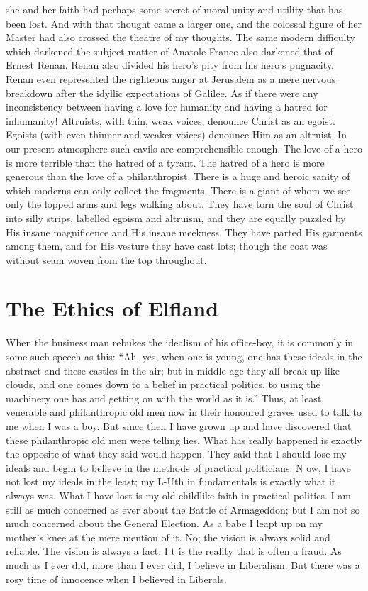 \documentclass{book}
\begin{document}
she and her faith had perhaps some secret of moral unity and utility that has been lost. And with that thought came a larger one, and the colossal figure of her Master had also crossed the theatre of my thoughts. The same modern difficulty which darkened the subject matter of Anatole France also darkened that of Ernest Renan. Renan also divided his hero’s pity from his hero’s pugnacity. Renan even represented the righteous anger at Jerusalem as a mere nervous breakdown after the idyllic expectations of Galilee. As if there were any inconsistency between having a love for humanity and having a hatred for inhumanity! Altruists, with thin, weak voices, denounce Christ as an egoist. Egoists (with even thinner and weaker voices) denounce Him as an altruist. In our present atmosphere such cavils are comprehensible enough. The love of a hero is more terrible than the hatred of a tyrant. The hatred of a hero is more generous than the love of a philanthropist. There is a huge and heroic sanity of which moderns can only collect the fragments. There is a giant of whom we see only the lopped arms and legs walking about. They have torn the soul of Christ into silly strips, labelled egoism and altruism, and they are equally puzzled by His insane magnificence and His insane meekness. They have parted His garments among them, and for His vesture they have cast lots; though the coat was without seam woven from the top throughout.

\chapter{The Ethics of Elfland}
\label{chapter-3}
When the business man rebukes the idealism of his office-boy, it is commonly in some such speech as this: “Ah, yes, when one is young, one has these ideals in the abstract and these castles in the air; but in middle age they all break up like clouds, and one comes down to a belief in practical politics, to using the machinery one has and getting on with the world as it is.” Thus, at least, venerable and philanthropic old men now in their honoured graves used to talk to me when I was a boy. But since then I have grown up and have discovered that these philanthropic old men were telling lies. What has really happened is exactly the opposite of what they said would happen. They said that I should lose my ideals and begin to believe in the methods of practical politicians. N ow, I have not lost my ideals in the least; my L-Üth in fundamentals is exactly what it always was. What I have lost is my old childlike faith in practical politics. I am still as much concerned as ever about the Battle of Armageddon; but I am not so much concerned about the General Election. As a babe I leapt up on my mother’s knee at the mere mention of it. No; the vision is always solid and reliable. The vision is always a fact. I t is the reality that is often a fraud. As much as I ever did, more than I ever did, I believe in Liberalism. But there was a rosy time of innocence when I believed in Liberals.
\end{document}
